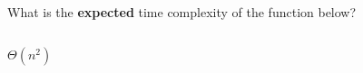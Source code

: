 \begin{prob}
    What is the \textbf{expected} time complexity of the function below?

    \inputminted{python}{./code.py}

    \begin{soln}
        $\Theta(n^2)$
    \end{soln}

\end{prob}
